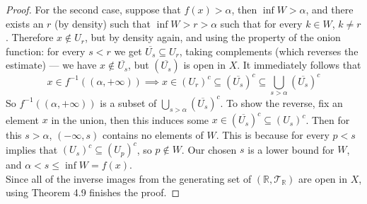 \documentclass[../../main.tex]{subfiles}
\begin{document}
\begin{proof}
For the second case, suppose that $f(x)>\alpha$, then $\inf W>\alpha$, and there exists an $r$ (by density) such that $\inf W>r>\alpha$ such that for every $k\in W$, $k\neq r$. Therefore $x\notin U_r$, but by density again, and using the property of the onion function: for every $s<r$ we get $\overline{U_s}\subseteq U_r$, taking complements (which reverses the estimate) — we have $x\notin \overline{U_s}$, but $\left(\overline{U_s}\right)$ is open in $X$. It immediately follows that
\[
x\in f^{-1}((\alpha,+\infty))\implies x\in (U_r)^c\subseteq \left(\overline{U_s}\right)^c\subseteq\bigcup_{s>\alpha}\left(\overline{U_s}\right)^c
\]
So $f^{-1}((\alpha,+\infty))$ is a subset of $\bigcup_{s>\alpha}\left(\overline{U_s}\right)^c$. To show the reverse, fix an element $x$ in the union, then this induces some $x\in \left(\overline{U_s}\right)^c\subseteq (U_s)^c$. Then for this $s>\alpha$, $(-\infty,s)$ contains no elements of $W$. This is because for every $p<s$ implies that $(U_s)^c\subseteq(U_p)^c$, so $p\notin W$. Our chosen $s$ is a lower bound for $W$, and $\alpha<s\leq\inf W =f(x)$.\\

Since all of the inverse images from the generating set of $(\mathbb{R},\mathcal{T}_{\mathbb{R}})$ are open in $X$, using Theorem 4.9 finishes the proof.
\end{proof}
\end{document}
